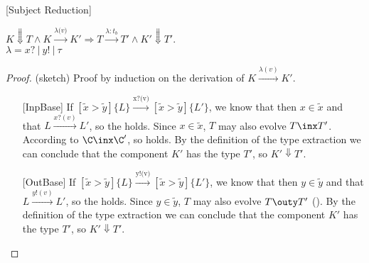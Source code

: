 \begin{theorem} [Subject
 Reduction] 

\begin{center}
    
    $K \Downarrow T \wedge K\xrightarrow{\textit{$\lambda$(v)}}K' \Rightarrow T\xrightarrow{\textit{$\lambda :t_b$}}T' \wedge K'\Downarrow T'$.\\
    
    $\lambda=x?\ |\ y!\ |\ \tau$
    
    
\end{center}

\end{theorem}

\begin{proof}(sketch) Proof by induction on the derivation of $K\xrightarrow{\text{$\lambda (v)$}} K'$. \\


\begin{itemize}

\item [{[InpBase]}] If $[\tilde{x}>\tilde{y}]\{L\}\xrightarrow{\text{x?(v)}}[\tilde{x}>\tilde{y}]\{L'\}$,  we know that then $x\in\tilde{x}$ and that $L\xrightarrow{x?(v)}L'$, so the  holds. Since $x\in\tilde{x}$, $T$ may also evolve $T\inx T'$. According to  $\C\inx \C'$, so  holds. By the definition of the type extraction we can conclude that the component $K'$ has the type $T'$, so $K'\Downarrow T'$. \\

\item [{[OutBase]}] If $[\tilde{x}>\tilde{y}]\{L\}\xrightarrow{\text{y!(v)}}[\tilde{x}>\tilde{y}]\{L'\}$, we know that then $y\in\tilde{y}$ and that $L\xrightarrow{y!(v)}L'$, so the  holds. Since $y\in\tilde{y}$, $T$ may also evolve $T\outy T'$ (). By the definition of the type extraction we can conclude that the component $K'$ has the type $T'$, so $K'\Downarrow T'$.\\

\end{itemize}





    



\end{proof}
